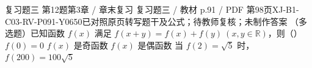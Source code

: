 \par\noindent\begin{minipage}{\linewidth}
\begin{bankitem}{复习题三 第12题}{第3章 / 章末复习 复习题三 / 教材 p.91 / PDF 第98页}{XJ-B1-C03-RV-P091-Y0650}{已对照原页转写题干及公式；待教师复核；未制作答案}
（多选题）已知函数 $f(x)$ 满足 $f(x+y)=f(x)+f(y)\ (x,y\in\mathbb R)$，则（\quad）
$f(0)=0$
$f(x)$ 是奇函数
$f(x)$ 是偶函数
当 $f(2)=\sqrt5$ 时，$f(200)=100\sqrt5$
\end{bankitem}
\end{minipage}\par\medskip
